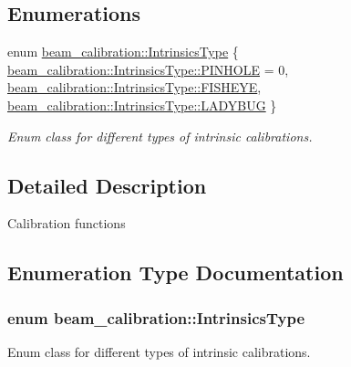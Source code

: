 \subsection*{Enumerations}
\begin{DoxyCompactItemize}
\item 
enum \hyperlink{group__calibration_ga9abafc7bdd7c31c8fdbd4cc90df9a956}{beam\+\_\+calibration\+::\+Intrinsics\+Type} \{ \hyperlink{group__calibration_gga9abafc7bdd7c31c8fdbd4cc90df9a956aa26b5d5659fbc90615fd36cf5d0a29c0}{beam\+\_\+calibration\+::\+Intrinsics\+Type\+::\+P\+I\+N\+H\+O\+LE} = 0, 
\hyperlink{group__calibration_gga9abafc7bdd7c31c8fdbd4cc90df9a956a59fe84c43d228f3307801ba9f7151157}{beam\+\_\+calibration\+::\+Intrinsics\+Type\+::\+F\+I\+S\+H\+E\+YE}, 
\hyperlink{group__calibration_gga9abafc7bdd7c31c8fdbd4cc90df9a956ad58295f6b3fb30f0c66af9f7f8a7cfd9}{beam\+\_\+calibration\+::\+Intrinsics\+Type\+::\+L\+A\+D\+Y\+B\+UG}
 \}\begin{DoxyCompactList}\small\item\em Enum class for different types of intrinsic calibrations. \end{DoxyCompactList}
\end{DoxyCompactItemize}


\subsection{Detailed Description}
Calibration functions 

\subsection{Enumeration Type Documentation}
\subsubsection[{\texorpdfstring{Intrinsics\+Type}{IntrinsicsType}}]{\setlength{\rightskip}{0pt plus 5cm}enum {\bf beam\+\_\+calibration\+::\+Intrinsics\+Type}\hspace{0.3cm}{\ttfamily [strong]}}\hypertarget{group__calibration_ga9abafc7bdd7c31c8fdbd4cc90df9a956}{}\label{group__calibration_ga9abafc7bdd7c31c8fdbd4cc90df9a956}


Enum class for different types of intrinsic calibrations. 

